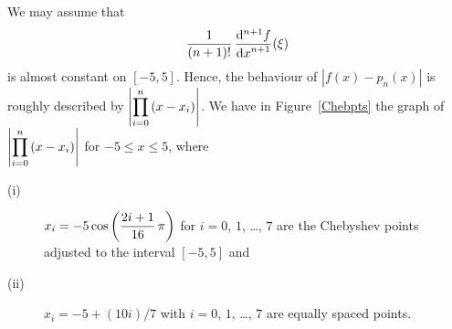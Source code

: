 \begin{rmkList}
\begin{enumerate}
We may assume that
\[
\frac{1}{(n+1)!}\,\displaystyle \frac{\mathrm{d}^{n+1}{f}} {\displaystyle \mathrm{d}{x}^{n+1}}(\xi)
\]
is almost constant on $[-5,5]$.   Hence, the behaviour of
$|f(x)-p_n(x)|$ is roughly described by
$\displaystyle \left|\prod_{i=0}^n\,(x-x_i)\right|$.
We have in Figure~\ref{Chebpts} the graph of
$\displaystyle \left|\prod_{i=0}^n\,(x-x_i)\right|$ for
$-5 \leq x \leq 5$, where
\begin{description}
\item[(i)]
$\displaystyle
x_i = -5\cos\left(\frac{2i+1}{16}\,\pi \right)$
for $i=0$, $1$, \ldots, $7$ are the Chebyshev points adjusted to the
interval $[-5,5]$ and
\item[(ii)]
$x_i = -5 + (10i)/7$ with $i=0$, $1$, \ldots, $7$ are equally
spaced points.
\end{description}
\end{enumerate}
\end{rmkList}


